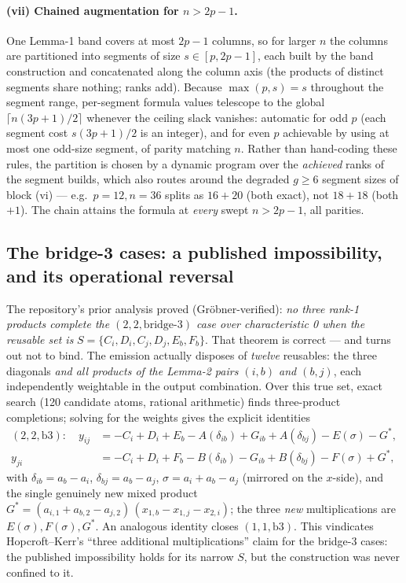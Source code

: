 \paragraph{(vii) Chained augmentation for \(n > 2p{-}1\).} One Lemma-1 band
covers at most \(2p{-}1\) columns, so for larger \(n\) the columns are
partitioned into segments of size \(s \in [p, 2p{-}1]\), each built by the
band construction and concatenated along the column axis (the products of
distinct segments share nothing; ranks add). Because \(\max(p,s) = s\)
throughout the segment range, per-segment formula values telescope to the
global \(\lceil n(3p{+}1)/2 \rceil\) whenever the ceiling slack vanishes:
automatic for odd \(p\) (each segment cost \(s(3p{+}1)/2\) is an integer),
and for even \(p\) achievable by using at most one odd-size segment, of
parity matching \(n\). Rather than hand-coding these rules, the partition is
chosen by a dynamic program over the \emph{achieved} ranks of the segment
builds, which also routes around the degraded \(g \ge 6\) segment sizes of
block (vi) — e.g.\ \(p{=}12, n{=}36\) splits as \(16{+}20\) (both exact), not
\(18{+}18\) (both \(+1\)). The chain attains the formula at \emph{every}
swept \(n > 2p{-}1\), all parities.

\subsection{The bridge-3 cases: a published impossibility, and its
operational reversal}

The repository's prior analysis proved (Gr\"obner-verified): \emph{no three
rank-1 products complete the \((2,2,\mathrm{bridge}\text{-}3)\) case over
characteristic 0 when the reusable set is}
\(S = \{C_i, D_i, C_j, D_j, E_b, F_b\}\). That theorem is correct — and
turns out not to bind. The emission actually disposes of \emph{twelve}
reusables: the three diagonals \emph{and all products of the Lemma-2 pairs
\((i,b)\) and \((b,j)\)}, each independently weightable in the output
combination. Over this true set, exact search (120 candidate atoms, rational
arithmetic) finds three-product completions; solving for the weights gives
the explicit identities
\begin{align*}
(2,2,\mathrm{b}3):\quad
y_{ij} &= -C_i + D_i + E_b - A(\delta_{ib}) + G_{ib} + A(\delta_{bj})
          - E(\sigma) - G^\ast,\\
y_{ji} &= -C_i + D_i + F_b - B(\delta_{ib}) - G_{ib} + B(\delta_{bj})
          - F(\sigma) + G^\ast,
\end{align*}
with \(\delta_{ib} = a_b - a_i\), \(\delta_{bj} = a_b - a_j\),
\(\sigma = a_i + a_b - a_j\) (mirrored on the \(x\)-side), and the single
genuinely new mixed product
\(G^\ast = (a_{i,1} + a_{b,2} - a_{j,2})\,(x_{1,b} - x_{1,j} - x_{2,i})\);
the three \emph{new} multiplications are \(E(\sigma), F(\sigma), G^\ast\).
An analogous identity closes \((1,1,\mathrm{b}3)\). This vindicates
Hopcroft--Kerr's ``three additional multiplications'' claim for the bridge-3
cases: the published impossibility holds for its narrow \(S\), but the
construction was never confined to it.

